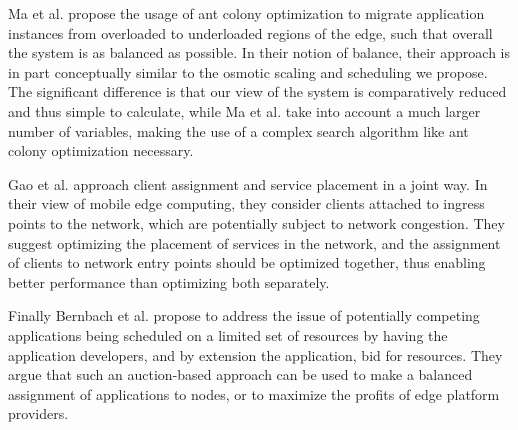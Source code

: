 Ma et al.\cite{maContainerMigrationMechanism2020} propose the usage of ant colony optimization to migrate application instances from overloaded to underloaded regions of the edge, such that overall the system is as balanced as possible.
In their notion of balance, their approach is in part conceptually similar to the osmotic scaling and scheduling we propose.
The significant difference is that our view of the system is comparatively reduced and thus simple to calculate, while Ma et al. take into account a much larger number of variables, making the use of a complex search algorithm like ant colony optimization necessary.

Gao et al.\cite{gaoWinningStartingLine2019} approach client assignment and service placement in a joint way.
In their view of mobile edge computing, they consider clients attached to ingress points to the network, which are potentially subject to network congestion.
They suggest optimizing the placement of services in the network, and the assignment of clients to network entry points should be optimized together, thus enabling better performance than optimizing both separately.

Finally Bernbach et al.\cite{beraldiCooperativeLoadBalancing2017} propose to address the issue of potentially competing applications being scheduled on a limited set of resources by having the application developers, and by extension the application, bid for resources.
They argue that such an auction-based approach can be used to make a balanced assignment of applications to nodes, or to maximize the profits of edge platform providers.

